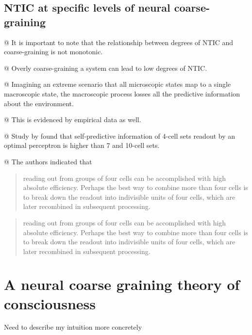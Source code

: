 \documentclass[utf8]{article}
\newenvironment{ants}
			{
			 \begin{easylist}[itemize]		
		 	}
			{
			\end{easylist}
			}
\newcommand{\ideaBox}[1]{
				\begin{tcolorbox}[%
					width=12cm,
					sharp corners=downhill, 
					hyphenationfix, 
					arc=8pt,
					colback=Thistle!50!white, 
					flush right,
					halign=flush right,
					]%
					#1
				\end{tcolorbox}
			}
\newcommand{\callforhelp}[1]{\todo[color=SpringGreen]{[Call For Help]: #1}}
\begin{document}
			
			
		\subsection{NTIC at specific levels of neural coarse-graining\callforhelp{any reference?}}
			\begin{ants}
				@ It is important to note that the relationship between degrees of NTIC and coarse-graining is not monotonic.
				
				@ Overly coarse-graining a system can lead to low degrees of NTIC.
				
				@ Imagining an extreme scenario that all microscopic states map to a single macroscopic state, the macroscopic process losses all the predictive information about the environment. 
				
				@ This is evidenced by empirical data as well. 	
				
				@ Study by \cite{sederberg2018learning} found that self-predictive information of 4-cell sets readout by an optimal perceptron is higher than 7 and 10-cell sets. 
				
				@ The authors indicated that \blockquote[{\citep{sederberg2018learning}}]{reading out from groups of four cells can be accomplished with high absolute efficiency. Perhaps the best way to combine more than four cells is to break down the readout into indivisible units of four cells, which are later recombined in subsequent processing.}
			\end{ants}
		
\blockquote{reading out from groups of four cells can be accomplished with high absolute efficiency. Perhaps the best way to combine more than four cells is to break down the readout into indivisible units of four cells, which are later recombined in subsequent processing.}\citep{sederberg2018learning}
			




			
	\section{A neural coarse graining theory of consciousness}
		\ideaBox{Need to describe my intuition more concretely}
		
\end{document}
